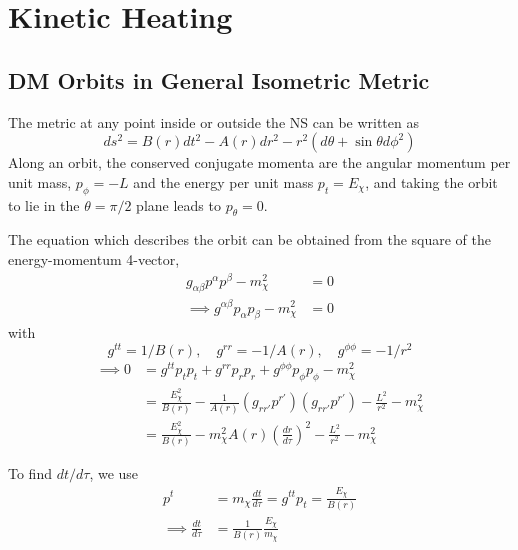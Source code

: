 \chapter{Kinetic Heating}
\label{appendix:kin_heating}

\section{DM Orbits in General Isometric Metric}

The metric at any point inside or outside the NS can be written as 
\begin{equation}
    ds^2 = B(r) dt^2 - A(r) dr^2 - r^2( d\theta + \sin\theta d\phi^2)
\end{equation}
Along an orbit, the conserved conjugate momenta are the angular momentum per unit mass, $p_\phi = -L$ 
and the energy per unit mass $p_t = E_\chi$, and taking the orbit to lie in the $\theta = \pi/2$ plane 
leads to $p_\theta = 0$. 

The equation which describes the orbit can be obtained from the square of the energy-momentum 4-vector,
\begin{align}
    g_{\alpha\beta} p^\alpha p^\beta - m_\chi^2 & = 0\\
    \implies g^{\alpha\beta} p_\alpha p_\beta - m_\chi^2 & = 0
\end{align}
with
\begin{equation}    
g^{tt} = 1/B(r),\quad g^{rr} = -1/A(r),\quad g^{\phi \phi} = -1/r^2
\end{equation}
\begin{align}
    \implies 0 & = g^{tt} p_t p_t + g^{rr} p_r p_r + g^{\phi\phi} p_\phi p_\phi - m_\chi^2 \\
    & = \frac{E_\chi^2}{B(r)} - \frac{1}{A(r)} \left( g_{rr'} p^{r'} \right)\left( g_{rr'} p^{r'} \right) - \frac{L^2}{r^2} - m_\chi^2 \\
    & = \frac{E_\chi^2}{B(r)} - m_\chi^2 A(r) \left( \frac{dr}{d\tau} \right)^2 - \frac{L^2}{r^2} - m_\chi^2
\end{align}

To find $dt/d\tau$, we use
\begin{align}
    p^t & = m_\chi \frac{dt}{d\tau} = g^{tt}p_t = \frac{E_\chi}{B(r)}\\
    \implies \frac{dt}{d\tau} & = \frac{1}{B(r)}\frac{E_\chi}{m_\chi}
\end{align}

